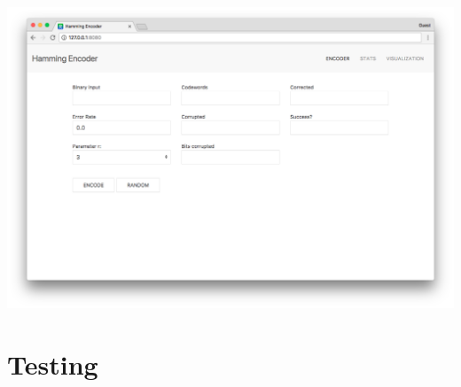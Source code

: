 \documentclass[11pt, oneside]{article}   	%
\begin{document}
\includegraphics[width=\textwidth]{main_blank}

\section*{Testing}
\end{document}
